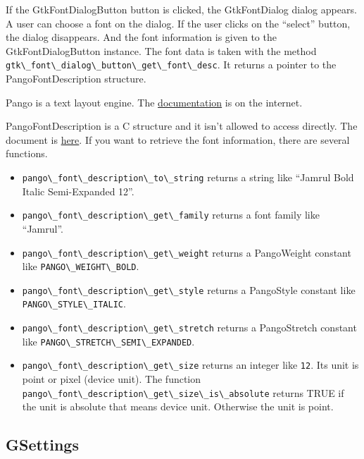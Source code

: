 If the GtkFontDialogButton button is clicked, the GtkFontDialog dialog
appears. A user can choose a font on the dialog. If the user clicks on
the ``select'' button, the dialog disappears. And the font information
is given to the GtkFontDialogButton instance. The font data is taken
with the method
\passthrough{\lstinline!gtk\_font\_dialog\_button\_get\_font\_desc!}. It
returns a pointer to the PangoFontDescription structure.

Pango is a text layout engine. The
\href{https://docs.gtk.org/Pango/index.html}{documentation} is on the
internet.

PangoFontDescription is a C structure and it isn't allowed to access
directly. The document is
\href{https://docs.gtk.org/Pango/struct.FontDescription.html}{here}. If
you want to retrieve the font information, there are several functions.

\begin{itemize}
\tightlist
\item
  \passthrough{\lstinline!pango\_font\_description\_to\_string!} returns
  a string like ``Jamrul Bold Italic Semi-Expanded 12''.
\item
  \passthrough{\lstinline!pango\_font\_description\_get\_family!}
  returns a font family like ``Jamrul''.
\item
  \passthrough{\lstinline!pango\_font\_description\_get\_weight!}
  returns a PangoWeight constant like
  \passthrough{\lstinline!PANGO\_WEIGHT\_BOLD!}.
\item
  \passthrough{\lstinline!pango\_font\_description\_get\_style!} returns
  a PangoStyle constant like
  \passthrough{\lstinline!PANGO\_STYLE\_ITALIC!}.
\item
  \passthrough{\lstinline!pango\_font\_description\_get\_stretch!}
  returns a PangoStretch constant like
  \passthrough{\lstinline!PANGO\_STRETCH\_SEMI\_EXPANDED!}.
\item
  \passthrough{\lstinline!pango\_font\_description\_get\_size!} returns
  an integer like \passthrough{\lstinline!12!}. Its unit is point or
  pixel (device unit). The function
  \passthrough{\lstinline!pango\_font\_description\_get\_size\_is\_absolute!}
  returns TRUE if the unit is absolute that means device unit. Otherwise
  the unit is point.
\end{itemize}

\subsection{GSettings}\label{gsettings}

